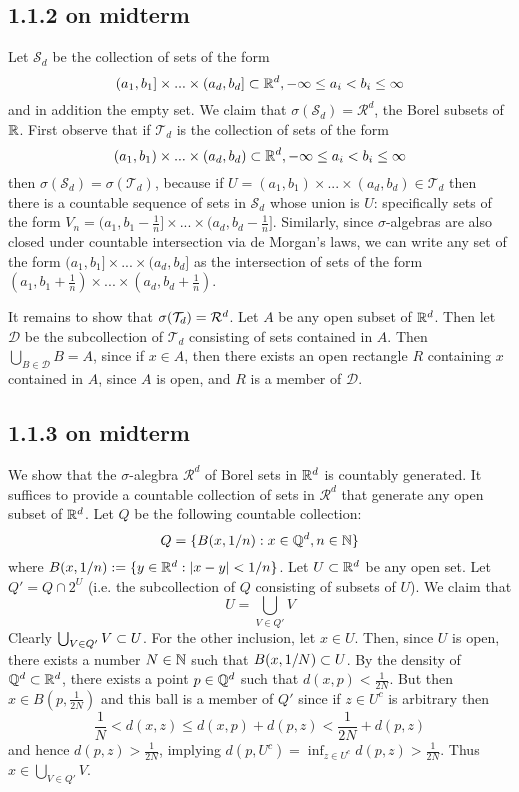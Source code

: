 \documentclass[11pt]{article}
\begin{document}
\subsection*{1.1.2 on midterm}

Let $\mathcal{S}_d$ be the collection of sets of the form \[(a_1, b_1]\times ... \times (a_d, b_d]\subset {\mathbb R}^d, -\infty\leq a_i < b_i \leq \infty\] and in addition the empty set. We claim that $\sigma(\mathcal{S}_d) = \mathcal{R}^d$, the Borel subsets of ${\mathbb R}$. First observe that if $\mathcal{T}_d$ is the collection of sets of the form \[(a_1, b_1)\times ... \times (a_d, b_d)\subset {\mathbb R}^d, -\infty\leq a_i < b_i \leq \infty\] then $\sigma(\mathcal{S}_d) = \sigma(\mathcal{T}_d)$, because if $U = (a_1, b_1)\times ... \times (a_d, b_d) \in \mathcal{T}_d$ then there is a countable sequence of sets in $\mathcal{S}_d$ whose union is $U$: specifically sets of the form $V_n = (a_1, b_1-\frac{1}{n}]\times ... \times (a_d, b_d-\frac{1}{n}]$. Similarly, since $\sigma$-algebras are also closed under countable intersection via de Morgan's laws, we can write any set of the form $(a_1, b_1]\times ... \times (a_d, b_d]$ as the intersection of sets of the form $(a_1, b_1+\frac{1}{n})\times ... \times (a_d, b_d+\frac{1}{n})$.

It remains to show that $\sigma(\mathcal{T}_d) = \mathcal{R}^d$. Let $A$ be any open subset of ${\mathbb R}^d$. Then let $\mathcal{D}$ be the subcollection of $\mathcal{T}_d$ consisting of sets contained in $A$. Then $\bigcup_{B \in \mathcal{D}} B = A$, since if $x \in A$, then there exists an open rectangle $R$ containing $x$ contained in $A$, since $A$ is open, and $R$ is a member of $\mathcal{D}$.

\subsection*{1.1.3 on midterm}

We show that the $\sigma$-alegbra $\mathcal{R}^d$ of Borel sets in ${\mathbb R}^d$ is countably generated. It suffices to provide a countable collection of sets in $\mathcal{R}^d$ that generate any open subset of ${\mathbb R}^d$. Let $Q$ be the following countable collection: \[Q = \{B(x, 1/n): x \in {\mathbb Q}^d, n \in {\mathbb N}\}\] where $B(x, 1/n) := \{y \in {\mathbb R}^d: |x-y|<1/n\}$. Let $U \subset {\mathbb R}^d$ be any open set. Let $Q' = Q \cap 2^U$ (i.e. the subcollection of $Q$ consisting of subsets of $U$). We claim that \[U = \bigcup_{V\in Q'} V\] Clearly $\bigcup_{V\in Q'} V \subset U$. For the other inclusion, let $x \in U$. Then, since $U$ is open, there exists a number $N \in {\mathbb N}$ such that $B(x, 1/N) \subset U$. By the density of ${\mathbb Q}^d \subset {\mathbb R}^d$, there exists a point $p \in {\mathbb Q}^d$ such that $d(x,p) < \frac{1}{2N}$. But then $x \in B(p, \frac{1}{2N})$ and this ball is a member of $Q'$ since if $z \in U^c$ is arbitrary then \[\frac{1}{N} < d(x,z) \leq d(x, p) + d(p, z) < \frac{1}{2N} + d(p,z)\] and hence $d(p,z) > \frac{1}{2N}$, implying $d(p, U^c) = \inf_{z\in U^c} d(p, z) > \frac{1}{2N}$. Thus $x \in \bigcup_{V\in Q'} V$.
\end{document}
